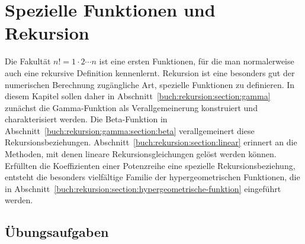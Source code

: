%
%
%
\chapter{Spezielle Funktionen und Rekursion
\label{buch:chapter:rekursion}}
Die Fakultät $n!=1\cdot 2\cdots n$ ist eine ersten Funktionen, für die
man normalerweise auch eine rekursive Definition kennenlernt.
Rekursion ist eine besonders gut der numerischen Berechnung zugängliche
Art, spezielle Funktionen zu definieren.
In diesem Kapitel sollen daher in
Abschnitt~\ref{buch:rekursion:section:gamma}
zunächst die Gamma-Funktion als Verallgemeinerung konstruiert
und charakterisiert werden.
Die Beta-Funktion in
Abschnitt~\ref{buch:rekursion:gamma:section:beta}
verallgemeinert diese Rekursionsbeziehungen.
Abschnitt~\ref{buch:rekursion:section:linear}
erinnert an die Methoden, mit denen lineare Rekursionsgleichungen
gelöst werden können. 
Erfüllten die Koeffizienten einer Potenzreihe eine spezielle
Rekursionsbeziehung, entsteht die besonders vielfältige Familie
der hypergeometrischen Funktionen, die in
Abschnitt~\ref{buch:rekursion:section:hypergeometrische-funktion}
eingeführt werden.






\section*{Übungsaufgaben}
\begin{uebungsaufgaben}
\end{uebungsaufgaben}

